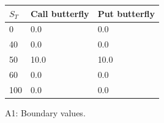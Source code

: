 \begin{center}
\small
\begin{tabular}{lll}
\toprule
$S_T$ & Call butterfly & Put butterfly\\
\midrule
0 & 0.0 & 0.0\\
40 & 0.0 & 0.0\\
50 & 10.0 & 10.0\\
60 & 0.0 & 0.0\\
100 & 0.0 & 0.0\\
\bottomrule
\end{tabular}
\par\smallskip A1: Boundary values.
\end{center}